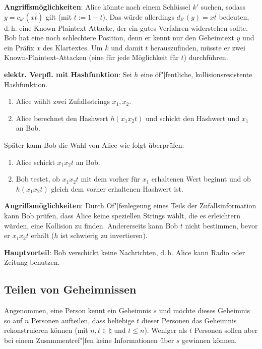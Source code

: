 \textbf{Angriffsmöglichkeiten}:
Alice könnte nach einem Schlüssel $k'$ suchen, sodass $y = c_{k'}(x\overline{t})$ gilt
(mit $\overline{t} := 1 - t$).
Das würde allerdings $d_{k'}(y) = x\overline{t}$ bedeuten,
d.\,h. eine Known-Plaintext-Attacke, der ein gutes Verfahren widerstehen sollte.
Bob hat eine noch schlechtere Position, denn er kennt nur den Geheimtext $y$ und
ein Präfix $x$ des Klartextes.
Um $k$ und damit $t$ herauszufinden, müsste er zwei Known-Plaintext-Attacken
(eine für jede Möglichkeit für $t$) durchführen.

\linie

\textbf{elektr. Verpfl. mit Hashfunktion}:
Sei $h$ eine öf"|fentliche, kollisionsresistente Hashfunktion.
\begin{enumerate}
    \item
    Alice wählt zwei Zufallsstrings $x_1, x_2$.

    \item
    Alice berechnet den Hashwert $h(x_1 x_2 t)$ und schickt den Hashwert und $x_1$ an Bob.
\end{enumerate}
Später kann Bob die Wahl von Alice wie folgt überprüfen:
\begin{enumerate}
    \item
    Alice schickt $x_1 x_2 t$ an Bob.

    \item
    Bob testet, ob $x_1 x_2 t$ mit dem vorher für $x_1$ erhaltenen Wert beginnt und ob
    $h(x_1 x_2 t)$ gleich dem vorher erhaltenen Hashwert ist.
\end{enumerate}

\textbf{Angriffsmöglichkeiten}:
Durch Of"|fenlegeung eines Teils der Zufallsinformation kann Bob prüfen,
dass Alice keine speziellen Strings wählt, die es erleichtern würden, eine Kollision zu finden.
Andererseits kann Bob $t$ nicht bestimmen, bevor er $x_1 x_2 t$ erhält
($h$ ist schwierig zu invertieren).

\textbf{Hauptvorteil}:
Bob verschickt keine Nachrichten, d.\,h. Alice kann Radio oder Zeitung benutzen.

\pagebreak

\subsection{%
    Teilen von Geheimnissen%
}

Angenommen, eine Person kennt ein Geheimnis $s$ und möchte dieses Geheimnis so auf
$n$ Personen aufteilen, dass beliebige $t$ dieser Personen das Geheimnis rekonstruieren können
(mit $n, t \in \natural$ und $t \le n$).
Weniger als $t$ Personen sollen aber bei einem Zusammentref"|fen keine Informationen über $s$
gewinnen können.

